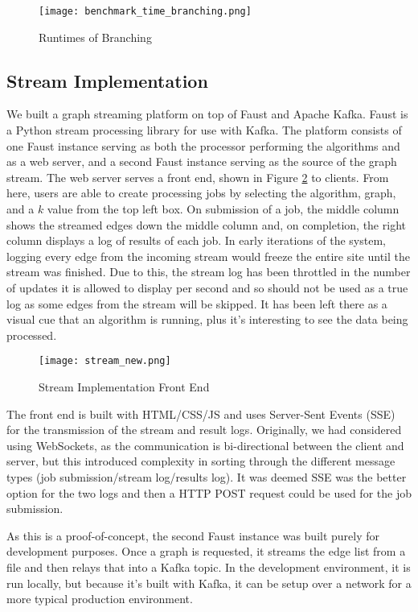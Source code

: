 \begin{figure}[H]
    \centering
    \texttt{[image: benchmark\_time\_branching.png]}
    \caption{Runtimes of Branching}
    \label{fig:benchmark_time_branching}
\end{figure}

\subsection{Stream Implementation}

We built a graph streaming platform on top of Faust and Apache Kafka. Faust is
a Python stream processing library for use with Kafka. The platform consists of
one Faust instance serving as both the processor performing the algorithms and
as a web server, and a second Faust instance serving as the source of the graph
stream. The web server serves a front end, shown in Figure
\ref{fig:stream_font_end} to clients. From here, users are able to create
processing jobs by selecting the algorithm, graph, and a \(k\) value from the
top left box. On submission of a job, the middle column shows the streamed
edges down the middle column and, on completion, the right column displays a
log of results of each job. In early iterations of the system, logging every
edge from the incoming stream would freeze the entire site until the stream was
finished. Due to this, the stream log has been throttled in the number of
updates it is allowed to display per second and so should not be used as a true
log as some edges from the stream will be skipped. It has been left there as a
visual cue that an algorithm is running, plus it's interesting to see the data
being processed.

\begin{figure}[htb]
    \centering
    \texttt{[image: stream\_new.png]}
    \caption{Stream Implementation Front End}
    \label{fig:stream_font_end}
\end{figure}

The front end is built with HTML/CSS/JS and uses Server-Sent Events (SSE) for
the transmission of the stream and result logs. Originally, we had considered
using WebSockets, as the communication is bi-directional between the client and
server, but this introduced complexity in sorting through the different message
types (job submission/stream log/results log). It was deemed SSE was the better
option for the two logs and then a HTTP POST request could be used for the job
submission.

As this is a proof-of-concept, the second Faust instance was built purely for
development purposes. Once a graph is requested, it streams the edge list from
a file and then relays that into a Kafka topic. In the development environment,
it is run locally, but because it's built with Kafka, it can be setup over a
network for a more typical production environment.

